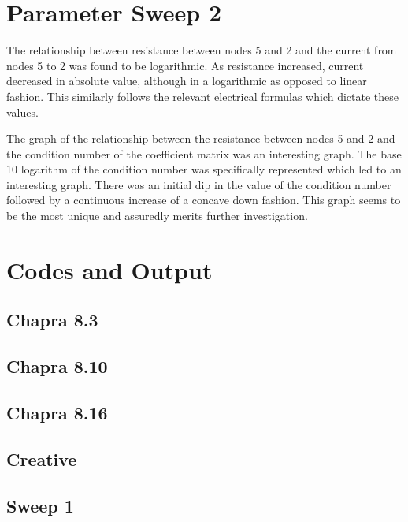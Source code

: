 \documentclass{article}
\begin{document}
\section{Parameter Sweep 2}
The relationship between resistance between nodes 5 and 2 and the current from nodes 5 to 2 was found to be logarithmic. As resistance increased, current decreased in absolute value, although in a logarithmic as opposed to linear fashion. This similarly follows the relevant electrical formulas which dictate these values. 

The graph of the relationship between the resistance between nodes 5 and 2 and the condition number of the coefficient matrix was an interesting graph. The base 10 logarithm of the condition number was specifically represented which led to an interesting graph. There was an initial dip in the value of the condition number followed by a continuous increase of a concave down fashion. This graph seems to be the most unique and assuredly merits further investigation. 
\pagebreak
\appendix
\section{Codes and Output}

\lstset{style=python103, language=python}

\subsection{Chapra 8.3}

\subsection{Chapra 8.10}

\subsection{Chapra 8.16}

\subsection{Creative}

\subsection{Sweep 1}

\end{document}
